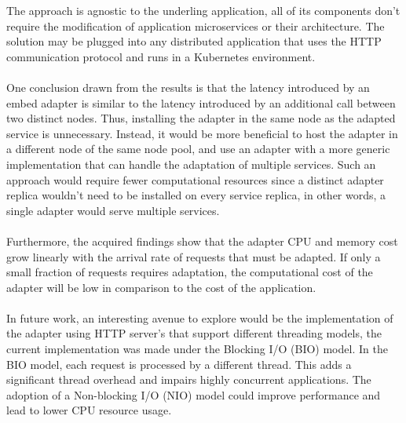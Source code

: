 The approach is agnostic to the underling application, all of its components don't require the modification of application microservices or their architecture.
The solution may be plugged into any distributed application that uses the HTTP communication protocol and runs in a Kubernetes environment.

\paragraph{}

One conclusion drawn from the results is that the latency introduced by an embed adapter is similar to the latency introduced by an additional call between two distinct nodes.
Thus, installing the adapter in the same node as the adapted service is unnecessary.
Instead, it would be more beneficial to host the adapter in a different node of the same node pool, and use an adapter with a more generic implementation that can handle the adaptation of multiple services.
Such an approach would require fewer computational resources since a distinct adapter replica wouldn't need to be installed on every service replica, in other words, a single adapter would serve multiple services.

\paragraph{}

Furthermore, the acquired findings show that the adapter CPU and memory cost grow linearly with the arrival rate of requests that must be adapted.
If only a small fraction of requests requires adaptation, the computational cost of the adapter will be low in comparison to the cost of the application.

\paragraph{}

In future work, an interesting avenue to explore would be the implementation of the adapter using HTTP server's that support different threading models, the current implementation
was made under the Blocking I/O (BIO) model.
In the BIO model, each request is processed by a different thread.
This adds a significant thread overhead and impairs highly concurrent applications.
The adoption of a Non-blocking I/O (NIO) model could improve performance and lead to lower CPU resource usage.

\paragraph{}

